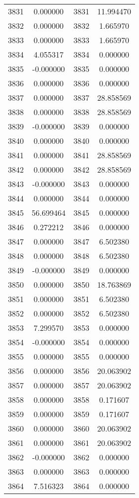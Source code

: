 \documentclass[12pt]{article}
\begin{document}
\begin{longtable}{@{}cccc@{}}
3831 & 0.000000 & 3831 & 11.994470 \\
3832 & 0.000000 & 3832 & 1.665970 \\
3833 & 0.000000 & 3833 & 1.665970 \\
3834 & 4.055317 & 3834 & 0.000000 \\
3835 & -0.000000 & 3835 & 0.000000 \\
3836 & 0.000000 & 3836 & 0.000000 \\
3837 & 0.000000 & 3837 & 28.858569 \\
3838 & 0.000000 & 3838 & 28.858569 \\
3839 & -0.000000 & 3839 & 0.000000 \\
3840 & 0.000000 & 3840 & 0.000000 \\
3841 & 0.000000 & 3841 & 28.858569 \\
3842 & 0.000000 & 3842 & 28.858569 \\
3843 & -0.000000 & 3843 & 0.000000 \\
3844 & 0.000000 & 3844 & 0.000000 \\
3845 & 56.699464 & 3845 & 0.000000 \\
3846 & 0.272212 & 3846 & 0.000000 \\
3847 & 0.000000 & 3847 & 6.502380 \\
3848 & 0.000000 & 3848 & 6.502380 \\
3849 & -0.000000 & 3849 & 0.000000 \\
3850 & 0.000000 & 3850 & 18.763869 \\
3851 & 0.000000 & 3851 & 6.502380 \\
3852 & 0.000000 & 3852 & 6.502380 \\
3853 & 7.299570 & 3853 & 0.000000 \\
3854 & -0.000000 & 3854 & 0.000000 \\
3855 & 0.000000 & 3855 & 0.000000 \\
3856 & 0.000000 & 3856 & 20.063902 \\
3857 & 0.000000 & 3857 & 20.063902 \\
3858 & 0.000000 & 3858 & 0.171607 \\
3859 & 0.000000 & 3859 & 0.171607 \\
3860 & 0.000000 & 3860 & 20.063902 \\
3861 & 0.000000 & 3861 & 20.063902 \\
3862 & -0.000000 & 3862 & 0.000000 \\
3863 & 0.000000 & 3863 & 0.000000 \\
3864 & 7.516323 & 3864 & 0.000000 \\

\end{longtable}
\end{document}
